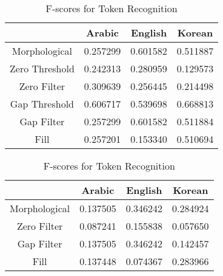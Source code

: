 \begin{table}
	\parbox{1\linewidth}{
		\centering
		\begin{tabular}{ | c | c | c | c |}
			\cline{2-4}
			\multicolumn{1}{c|}{} & Arabic & English & Korean \\ \hline
			Morphological & 0.257299 & 0.601582 & 0.511887 \\ \hline \hline
			Zero Threshold & 0.242313 & 0.280959 & 0.129573 \\ \hline
			Zero Filter & 0.309639 & 0.256445 & 0.214498 \\\hline \hline
			Gap Threshold & 0.606717 & 0.539698 & 0.668813 \\ \hline
			Gap Filter & 0.257299 & 0.601582 & 0.511884 \\ \hline \hline
			Fill & 0.257201 & 0.153340 & 0.510694 \\ \hline
		\end{tabular}
		\caption{F-scores for Boundary Recognition}
		\label{bsumtable}
	}

	\parbox{1\linewidth}{
		\centering
		\begin{tabular}{ | c | c | c | c |}
			\cline{2-4}
			\multicolumn{1}{c|}{} & Arabic & English & Korean \\ \hline
			Morphological & 0.137505 & 0.346242 & 0.284924 \\ \hline
			Zero Filter & 0.087241 & 0.155838 & 0.057650 \\ \hline
			Gap Filter & 0.137505 & 0.346242 & 0.142457 \\ \hline
			Fill & 0.137448 & 0.074367 & 0.283966 \\ \hline
		\end{tabular}
		\caption{F-scores for Token Recognition}
		\label{tsumtable}
	}
\end{table}
\FloatBarrier

